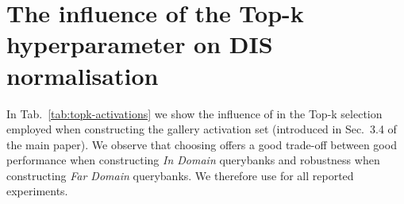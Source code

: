\section{The influence of the Top-k hyperparameter on DIS normalisation}
\label{sec:topk-supp}
\begin{table}
\begin{center}
\end{center}
\vspace{\spacebefore{}}
\caption{\textbf{
The influence of the  hyperparameter on DIS normalisation.} 
Performance is reported on MSR-VTT \texttt{full} split~\cite{xu2016msr},
while querybanks of 5,000 samples
are sampled from the training sets of different datasets.
We observe that for \textit{Far Domain} querybanks,
 performs the best,
while retaining good performance for \textit{In Domain} querybanks.
\label{tab:topk-activations}}
\vspace{\spaceafter{}}
\end{table} In Tab.~\ref{tab:topk-activations} we show the influence of  in the Top-k selection employed when constructing the gallery activation set (introduced in Sec.~3.4 of the main paper).
We observe that choosing  offers a 
good trade-off between good performance when
constructing \textit{In Domain} querybanks
and robustness when constructing
\textit{Far Domain} querybanks.
We therefore use  for all reported experiments.


